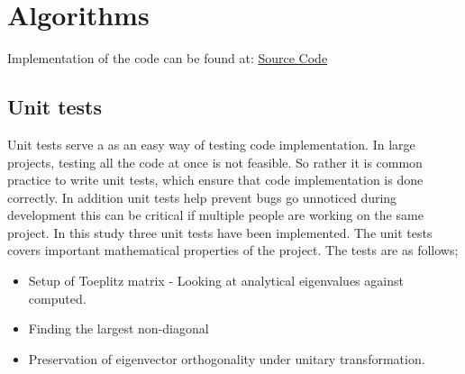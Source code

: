 \documentclass[%
reprint,
nofootinbib,
amsmath,amssymb,
aps,
]{revtex4-1}
\begin{document}
\section{Algorithms}%
Implementation of the code can be found at: \href{https://github.com/SigurdSundberg/FYS3150/tree/master/project2/code/cpp_codes}{Source Code}
\subsection{Unit tests}%
Unit tests serve a as an easy way of testing code implementation. In large projects, testing all the code at once is not feasible. So rather it is common practice to write unit tests, which ensure that code implementation is done correctly. In addition unit tests help prevent bugs go unnoticed during development this can be critical if multiple people are working on the same project. 
In this study three unit tests have been implemented. The unit tests covers important mathematical properties of the project. 
The tests are as follows;
\begin{itemize}
	\item Setup of Toeplitz matrix - Looking at analytical eigenvalues against computed. 
	\item Finding the largest non-diagonal 
	\item Preservation of eigenvector orthogonality under unitary transformation.
\end{itemize}
\end{document}
